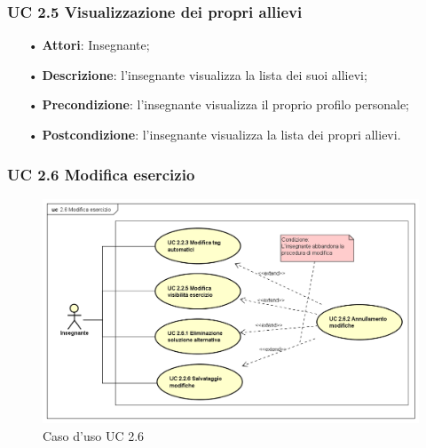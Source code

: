 \subsubsection{UC 2.5 Visualizzazione dei propri allievi}


\begin{itemize}
	\item[•] \textbf{Attori}: Insegnante;
	\item[•] \textbf{Descrizione}: l’insegnante visualizza la lista dei suoi allievi;
	\item[•] \textbf{Precondizione}: l'insegnante visualizza il proprio profilo personale;
	\item[•] \textbf{Postcondizione}: l’insegnante visualizza la lista dei propri allievi.
\end{itemize}



\subsubsection{UC 2.6 Modifica esercizio}
\begin{figure}[H]
\centering
\includegraphics[width=17cm]{img/UC26.png} 
\caption{Caso d'uso UC 2.6}
\end{figure}


